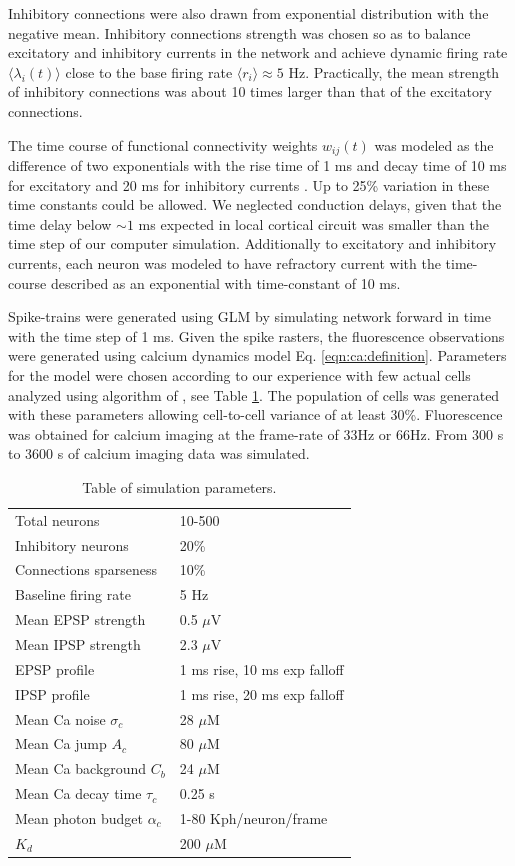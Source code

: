 Inhibitory connections were also drawn from exponential distribution with the negative mean. Inhibitory connections strength was chosen so as to balance excitatory and inhibitory currents in the network and achieve dynamic firing rate $\langle \lambda_i(t) \rangle$ close to the base firing rate $\langle r_i\rangle \approx 5 $ Hz. Practically, the mean strength of inhibitory connections was about 10 times larger than that of the excitatory connections. 

The time course of functional connectivity weights $w_{ij}(t)$ was modeled as the difference of two exponentials with the rise time of 1 ms and decay time of 10 ms for excitatory and 20 ms for inhibitory currents \cite{Sayer1990}. Up to 25\% variation in these time constants could be allowed. We neglected conduction delays, given that the time delay below $\sim 1$ ms expected in local cortical circuit was smaller than the time step of our computer simulation.  Additionally to excitatory and inhibitory currents, each neuron was modeled to have refractory current with the time-course described as an exponential with time-constant of 10 ms.

Spike-trains were generated using GLM by simulating network forward in time with the time step of 1 ms.  Given the spike rasters, the fluorescence observations were generated using calcium dynamics model Eq. \eqref{eqn:ca:definition}. Parameters for the model were chosen according to our experience with few actual cells analyzed using algorithm of \cite{Vogelstein2009}, see Table \ref{table:caparm}.  The population of cells was generated with these parameters allowing cell-to-cell variance of at least 30\%.  Fluorescence was obtained for calcium imaging at the frame-rate of 33Hz or 66Hz.  From 300 s to 3600 s of calcium imaging data was simulated.

\begin{table}[h!b!p!]
\caption{Table of simulation parameters.}\label{table:caparm}
\begin{tabular}{ll}
\hline
Total neurons & 10-500 \\
Inhibitory neurons & 20\% \\
Connections sparseness & 10\% \\
Baseline firing rate & 5 Hz \\
Mean EPSP strength & 0.5 $\mu$V \\
Mean IPSP strength & 2.3 $\mu$V\\
EPSP profile & 1 ms rise, 10 ms exp falloff \\
IPSP profile & 1 ms rise, 20 ms exp falloff \\
\hline
Mean Ca noise $\sigma_c$ & 28 $\mu$M \\
Mean Ca jump $A_c$ & 80 $\mu$M \\
Mean Ca background $C_b$ & 24 $\mu$M \\
Mean Ca decay time $\tau_c$ & 0.25 s \\
Mean photon budget $\alpha_c$ & 1-80 Kph/neuron/frame \\
$K_d$ & 200 $\mu$M \\
\hline
\end{tabular}
\end{table}

